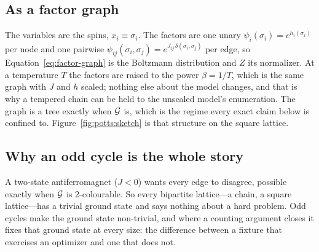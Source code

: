 \documentclass[11pt,a4paper]{article}
\begin{document}
\subsection{As a factor graph}
The variables are the spins, $x_i \equiv \sigma_i$. The factors are one unary
$\psi_i(\sigma_i) = e^{h_i(\sigma_i)}$ per node and one pairwise
$\psi_{ij}(\sigma_i, \sigma_j) = e^{J_{ij}\,\delta(\sigma_i, \sigma_j)}$ per
edge, so Equation~\ref{eq:factor-graph} is the Boltzmann distribution and $Z$
its normalizer. At a temperature $T$ the factors are raised to the power
$\beta = 1/T$, which is the same graph with $J$ and $h$ scaled; nothing else
about the model changes, and that is why a tempered chain can be held to the
unscaled model's enumeration. The graph is a tree exactly when $\mathcal{G}$ is,
which is the regime every exact claim below is confined to.
Figure~\ref{fig:potts:sketch} is that structure on the square lattice.



\subsection{Why an odd cycle is the whole story}
A two-state antiferromagnet ($J < 0$) wants every edge to disagree, possible
exactly when $\mathcal{G}$ is $2$-colourable. So every bipartite lattice---a chain,
a square lattice---has a trivial ground state and says nothing about a hard
problem. Odd cycles make the ground state non-trivial, and where a counting
argument closes it fixes that ground state at every size: the difference
between a fixture that exercises an optimizer and one that does not.
\end{document}
